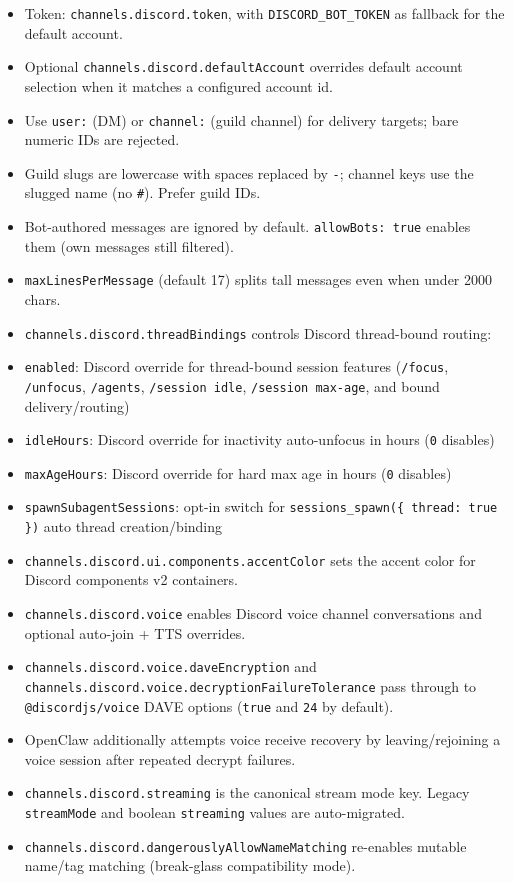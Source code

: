 \begin{itemize}
  \item Token: \texttt{channels.discord.token}, with \texttt{DISCORD\_BOT\_TOKEN} as fallback for the default account.
  \item Optional \texttt{channels.discord.defaultAccount} overrides default account selection when it matches a configured account id.
  \item Use \texttt{user:} (DM) or \texttt{channel:} (guild channel) for delivery targets; bare numeric IDs are rejected.
  \item Guild slugs are lowercase with spaces replaced by \texttt{-}; channel keys use the slugged name (no \texttt{\#}). Prefer guild IDs.
  \item Bot-authored messages are ignored by default. \texttt{allowBots: true} enables them (own messages still filtered).
  \item \texttt{maxLinesPerMessage} (default 17) splits tall messages even when under 2000 chars.
  \item \texttt{channels.discord.threadBindings} controls Discord thread-bound routing:
  \item \texttt{enabled}: Discord override for thread-bound session features (\texttt{/focus}, \texttt{/unfocus}, \texttt{/agents}, \texttt{/session idle}, \texttt{/session max-age}, and bound delivery/routing)
  \item \texttt{idleHours}: Discord override for inactivity auto-unfocus in hours (\texttt{0} disables)
  \item \texttt{maxAgeHours}: Discord override for hard max age in hours (\texttt{0} disables)
  \item \texttt{spawnSubagentSessions}: opt-in switch for \texttt{sessions\_spawn(\{ thread: true \})} auto thread creation/binding
  \item \texttt{channels.discord.ui.components.accentColor} sets the accent color for Discord components v2 containers.
  \item \texttt{channels.discord.voice} enables Discord voice channel conversations and optional auto-join + TTS overrides.
  \item \texttt{channels.discord.voice.daveEncryption} and \texttt{channels.discord.voice.decryptionFailureTolerance} pass through to \texttt{@discordjs/voice} DAVE options (\texttt{true} and \texttt{24} by default).
  \item OpenClaw additionally attempts voice receive recovery by leaving/rejoining a voice session after repeated decrypt failures.
  \item \texttt{channels.discord.streaming} is the canonical stream mode key. Legacy \texttt{streamMode} and boolean \texttt{streaming} values are auto-migrated.
  \item \texttt{channels.discord.dangerouslyAllowNameMatching} re-enables mutable name/tag matching (break-glass compatibility mode).
\end{itemize}


